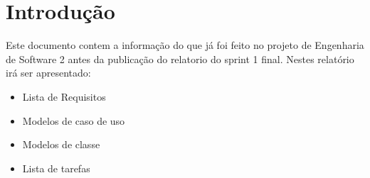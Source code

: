 \section{Introdução}
Este documento contem a informação do que já foi feito no projeto de Engenharia de Software 2 antes da publicação do relatorio do sprint 1 final.
Nestes relatório irá ser apresentado:
\begin{itemize}
    \item Lista de Requisitos
    \item Modelos de caso de uso
    \item Modelos de classe
    \item Lista de tarefas
\end{itemize}